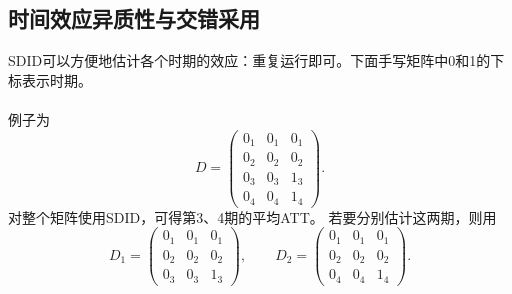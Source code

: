 \subsection{时间效应异质性与交错采用}
SDID可以方便地估计各个时期的效应：重复运行即可。下面手写矩阵中0和1的下标表示时期。
\paragraph{}
例子为
\[
D=\begin{pmatrix}
0_1&0_1&0_1\\0_2&0_2&0_2\\0_3&0_3&1_3\\0_4&0_4&1_4
\end{pmatrix}.
\]
对整个矩阵使用SDID，可得第3、4期的平均ATT。
 若要分别估计这两期，则用
\[
D_1=\begin{pmatrix}0_1&0_1&0_1\\0_2&0_2&0_2\\0_3&0_3&1_3\end{pmatrix},
\qquad
D_2=\begin{pmatrix}0_1&0_1&0_1\\0_2&0_2&0_2\\0_4&0_4&1_4\end{pmatrix}.
\]

